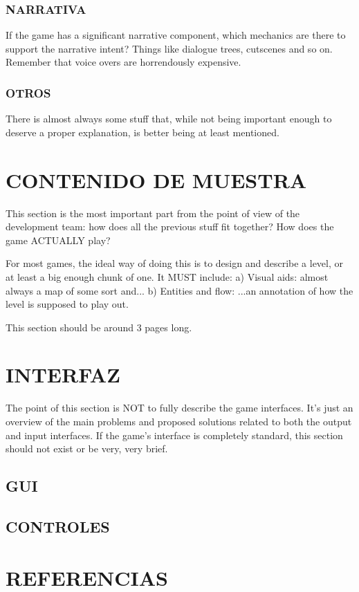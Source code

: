 \documentclass{article}
\begin{document}
    \subsubsection{NARRATIVA}
    If the game has a significant narrative component, which mechanics are there to support the narrative intent? Things like dialogue trees, cutscenes and so on. Remember that voice overs are horrendously expensive.

    \subsubsection{OTROS}
    There is almost always some stuff that, while not  being important enough to deserve a proper explanation, is better being at least mentioned.


    \newpage
    \section{CONTENIDO DE MUESTRA}

    This section is the most important part from the point of view of the development team: how does all the previous stuff fit together? How does the game ACTUALLY play?

For most games, the ideal way of doing this is to design and describe a level, or at least a big enough chunk of one. It MUST include:
    a) Visual aids: almost always a map of some sort and...
    b) Entities and flow: ...an annotation of how the level is supposed to play out.

This section should be around 3 pages long.

\newpage
\section{INTERFAZ}
The point of this section is NOT to fully describe the game interfaces. It’s just an overview of the main problems and proposed solutions related to both the output and input interfaces. If the game’s interface is completely standard, this section should not exist or be very, very brief.

\subsection{GUI}

\subsection{CONTROLES}

\newpage
\section{REFERENCIAS} %
\end{document}
